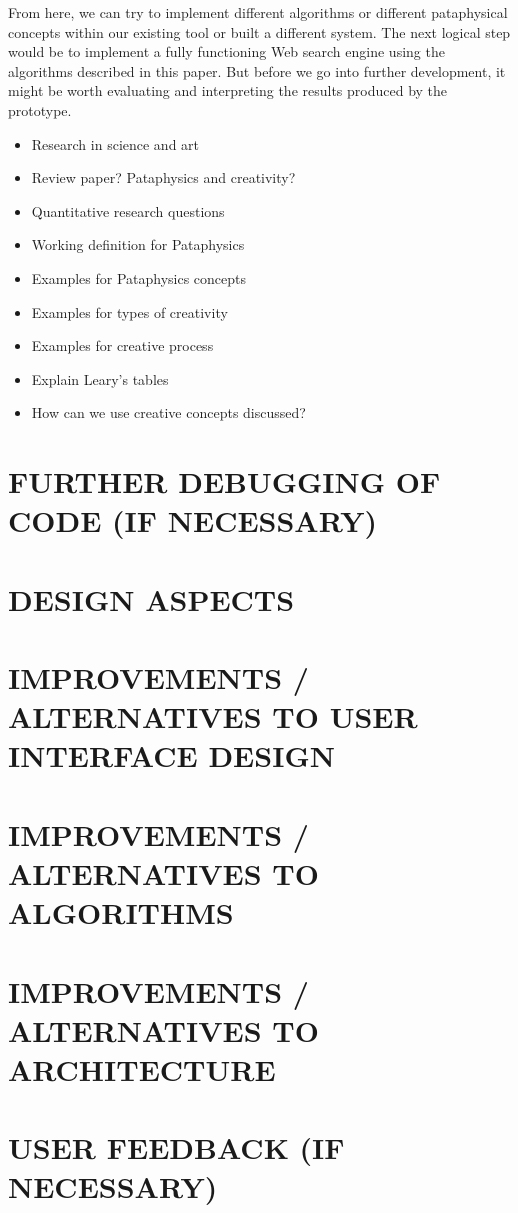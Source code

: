 From here, we can try to implement different algorithms or different pataphysical concepts within our existing tool or built a different system. The next logical step would be to implement a fully functioning Web search engine using the algorithms described in this paper. But before we go into further development, it might be worth evaluating and interpreting the results produced by the prototype.

\begin{itemize}
  \item Research in science and art
  \item Review paper? Pataphysics and creativity?
  \item Quantitative research questions
  \item Working definition for Pataphysics
  \item Examples for Pataphysics concepts
  \item Examples for types of creativity
  \item Examples for creative process
  \item Explain Leary's tables
  \item How can we use creative concepts discussed?
\end{itemize}


\section{FURTHER DEBUGGING OF CODE (IF NECESSARY)}

\section{DESIGN ASPECTS}

\section{IMPROVEMENTS / ALTERNATIVES TO USER INTERFACE DESIGN}

\section{IMPROVEMENTS / ALTERNATIVES TO ALGORITHMS}

\section{IMPROVEMENTS / ALTERNATIVES TO ARCHITECTURE}

\section{USER FEEDBACK (IF NECESSARY)}

\stopcontents[chapters]

